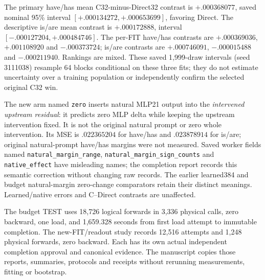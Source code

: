 The primary have/has mean C32-minus-Direct32 contrast is $+.000368077$, saved nominal 95\% interval $[+.000134272,+.000653699]$, favoring Direct. The descriptive is/are mean contrast is $+.000172888$, interval $[-.000127204,+.000484746]$. The per-FIT have/has contrasts are $+.000369036$, $+.001108920$ and $-.000373724$; is/are contrasts are $+.000746091$, $-.000015488$ and $-.000211940$. Rankings are mixed. These saved 1,999-draw intervals (seed 3111038) resample 64 blocks conditional on these three fits; they do not estimate uncertainty over a training population or independently confirm the selected original C32 win.

The new arm named \texttt{zero} inserts natural MLP21 output into the \emph{intervened upstream residual}: it predicts zero MLP delta while keeping the upstream intervention fixed. It is not the original natural prompt or zero whole intervention. Its MSE is $.022365204$ for have/has and $.023878914$ for is/are; original natural-prompt have/has margins were not measured. Saved worker fields named \texttt{natural\_margin\_range}, \texttt{natural\_margin\_sign\_counts} and \texttt{native\_effect} have misleading names; the completion report records this semantic correction without changing raw records. The earlier learned384 and budget natural-margin zero-change comparators retain their distinct meanings. Learned/native errors and C--Direct contrasts are unaffected.

The budget TEST uses 18,726 logical forwards in 3,336 physical calls, zero backward, one load, and 1,659.328 seconds from first load attempt to immutable completion. The new-FIT/readout study records 12,516 attempts and 1,248 physical forwards, zero backward. Each has its own actual independent completion approval and canonical evidence. The manuscript copies those reports, summaries, protocols and receipts without rerunning measurements, fitting or bootstrap.
